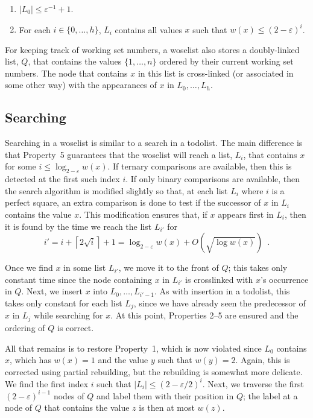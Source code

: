 \documentclass[lotsofwhite]{patmorin}
\newcommand{\eps}{\varepsilon}
\begin{document}
\begin{enumerate}
\item $|L_0|\le \eps^{-1}+1$.
\setcounter{enumi}{4}
\item For each $i\in\{0,\ldots,h\}$, $L_i$ contains all values $x$ such that $w(x)\le (2-\eps)^i$.
\end{enumerate}

For keeping track of working set numbers, a woselist also stores a
doubly-linked list, $Q$, that contains the values $\{1,\ldots,n\}$
ordered by their current working set numbers.  The node that contains $x$
in this list is cross-linked (or associated in some other way) with the
appearances of $x$ in $L_0,\ldots,L_h$.

\subsection{Searching}

Searching in a woselist is similar to a search in a todolist.
The main
difference is that Property~5 guarantees that the woselist will reach
a list, $L_i$, that contains $x$ for some $i\le\log_{2-\eps} w(x)$.
If ternary comparisons are available, then this is detected at the
first such index $i$.  If only binary comparisons are available, then
the search algorithm is modified slightly so that, at each list $L_i$
where $i$ is a perfect square, an extra comparison is done to test if
the successor of $x$ in $L_i$ contains the value $x$.  This modification
ensures that, if $x$ appears first in $L_i$, then it is found by the
time we reach the list $L_{i'}$ for
\[
     i'=i+\left\lceil 2\sqrt{i}\right\rceil + 1 = \log_{2-\eps} w(x) + O(\sqrt{\log w(x)}) \enspace .
\]

Once we find $x$ in some list $L_{i'}$, we move it to the front of $Q$;
this takes only constant time since the node containing $x$ in $L_{i'}$
is crosslinked with $x$'s occurrence in $Q$.  Next, we insert $x$ into
$L_0,\ldots,L_{i'-1}$.  As with insertion in a todolist, this takes only
constant for each list $L_j$, since we have already seen the predecessor
of $x$ in $L_j$ while searching for $x$.  
At this point, Properties 2--5 are ensured and the ordering of $Q$ is
correct.  

All that remains is to restore Property~1, which is now violated
since $L_0$ contains $x$, which has $w(x)=1$ and the value $y$ such
that $w(y)=2$.  Again, this is corrected using partial rebuilding,
but the rebuilding is somewhat more delicate.  We find the first index
$i$ such that $|L_i|\le (2-\eps/2)^i$.  Next, we traverse the first
$(2-\eps)^{i-1}$ nodes of $Q$ and label them with their position in
$Q$; the label at a node of $Q$ that contains the value $z$ is then at
most $w(z)$.  
\end{document}
